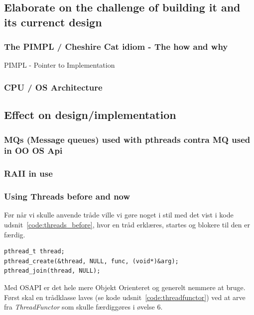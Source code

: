 \subsection{Elaborate on the challenge of building it and its currenct design}

\subsubsection{The PIMPL / Cheshire Cat idiom - The how and why}

PIMPL - Pointer to Implementation

\subsubsection{CPU / OS Architecture}

\subsection{Effect on design/implementation}

\subsubsection{MQs (Message queues) used with pthreads contra MQ used in OO OS Api}

\subsubsection{RAII in use}


\subsubsection{Using Threads before and now}
Før når vi skulle anvende tråde ville vi gøre noget i stil med det vist i kode udsnit~\ref{code:threads_before}, hvor en tråd erklæres, startes og blokere til den er færdig.

\begin{lstlisting}[caption=Anvendelse af tråde før OSAPI, label=code:threads_before, morekeywords={pthread_t, pthread_create, pthread_join}]
pthread_t thread;
pthread_create(&thread, NULL, func, (void*)&arg);
pthread_join(thread, NULL);
\end{lstlisting}

Med OSAPI er det hele mere Objekt Orienteret og generelt nemmere at bruge. Først skal en trådklasse laves (se kode udsnit~\ref{code:threadfunctor}) ved at arve fra \textit{ThreadFunctor} som skulle færdiggøres i øvelse 6.

